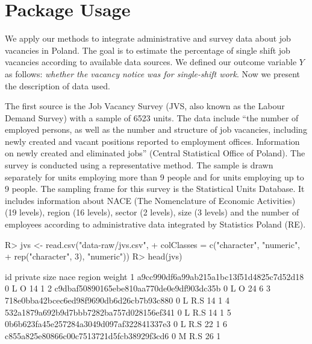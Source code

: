 \documentclass[
]{jss}
\begin{document}
\hypertarget{package-usage}{%
\section{Package Usage}\label{package-usage}}

We apply our methods to integrate administrative and survey data about
job vacancies in Poland. The goal is to estimate the percentage of
single shift job vacancies according to available data sources. We
defined our outcome variable \(Y\) as follows:
\textit{whether the vacancy notice was for single-shift work}. Now we
present the description of data used.

The first source is the Job Vacancy Survey (JVS, also known as the
Labour Demand Survey) with a sample of 6523 units. The data include
``the number of employed persons, as well as the number and structure of
job vacancies, including newly created and vacant positions reported to
employment offices. Information on newly created and eliminated jobs''
(Central Statistical Office of Poland). The survey is conducted using a
representative method. The sample is drawn separately for units
employing more than 9 people and for units employing up to 9 people. The
sampling frame for this survey is the Statistical Units Database. It
includes information about NACE (The Nomenclature of Economic
Activities) (19 levels), region (16 levels), sector (2 levels), size (3
levels) and the number of employees according to administrative data
integrated by Statistics Poland (RE).

\begin{CodeChunk}
\begin{CodeInput}
R> jvs <- read.csv("data-raw/jvs.csv",
+                   colClasses = c("character", "numeric",
+                                  rep("character", 3), "numeric"))
R> head(jvs)
\end{CodeInput}
\begin{CodeOutput}
                                        id private size nace region weight
1 a9cc990df6a99ab215a1bc13f51d4825c7d52d18       0    L    O     14      1
2 c9dbaf50890165ebe810aa770de0e9df903dc35b       0    L    O     24      6
3 718e0bba42bcec6ed98f9690db6d26cb7b93c880       0    L  R.S     14      1
4 532a1879a692b9d7bbb7282ba757d028156ef341       0    L  R.S     14      1
5 0b6b623fa45e257284a3049d097af322841337e3       0    L  R.S     22      1
6 c855a825e80866c00c7513721d5fcb38929f3cd6       0    M  R.S     26      1
\end{CodeOutput}
\end{CodeChunk}
\end{document}
